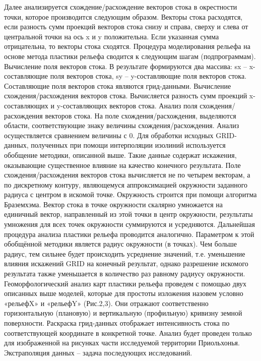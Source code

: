 \documentclass[runningheads]{AIIT}
\begin{document}
Далее анализируется схождение/расхождение векторов стока в окрестности точки, которое производится следующим образом. Векторы стока расходятся, если разность сумм проекций векторов стока снизу и справа, сверху и слева от центральной точки на ось x и y положительна. Если указанная сумма отрицательна, то векторы стока сходятся.
Процедура моделирования рельефа на основе метода пластики рельефа сводится к следующим шагам (подпрограммам).
Вычисление поля векторов стока. В результате формируются два массива: sx – x-составляющие поля векторов стока, sy – y-составляющие поля векторов стока. Составляющие поля векторов стока являются грид-данными.
Вычисление схождения/расхождения векторов стока. Вычисляется разность сумм проекций x-составляющих и y-составляющих векторов стока.
Анализ поля схождения/расхождения векторов стока. На поле схождения/расхождения, выделяются области, соответствующие знаку величины схождения/расхождения. Анализ осуществляется сравнением величины с 0.
Для обработки исходных GRID-данных, полученных при помощи интерполяции изолиний используется обобщение методики, описанной выше. Такие данные содержат искажения, оказывающие существенное влияние на качество конечного результата. Поле схождения/расхождения векторов стока вычисляется не по четырем векторам, а по дискретному контуру, являющемуся аппроксимацией окружности заданного радиуса с центром в искомой точке.
Окружность строится при помощи алгоритма Браземхэма. Вектор стока в точке окружности скалярно умножается на единичный вектор, направленный из этой точки в центр окружности, результаты умножения для всех точек окружности суммируются и усредняются. Дальнейшая процедура анализа пластики рельефа проводится аналогично.
Параметром к этой обобщённой методики является радиус окружности (в точках). Чем больше радиус, тем сильнее будет происходить усреднение значений, т.е. уменьшение влияния искажений GRID на конечный результат, однако разрешение искомого результата также уменьшается в количество раз равному радиусу окружности.
Геоморфологический анализ карт пластики рельефа проведем с помощью двух описанных выше моделей, которые для простоты изложения назовем условно «рельефX» и «рельефY» (Рис.2,3). Они отражают соответственно горизонтальную (плановую) и вертикальную (профильную) кривизну земной поверхности. Раскраска грид-данных отображает интенсивность стока по соответствующей координате в конкретной точке. Анализ будет проведен только для изображенной на рисунках части исследуемой территории Приольхонья. Экстраполяция данных – задача последующих исследований.
\end{document}
